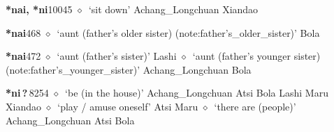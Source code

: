   \begin{list}{}{\leftmargin=1.5em \itemindent=-1.5em}
  \item {\footnotesize \textbf{*nai, *ni}}{\tiny 10045}
         $\diamond$~`sit down'
         Achang\_Longchuan 
\hspace{1ex}
         Xiandao 
  \item {\footnotesize \textbf{*nai}}{\tiny 468}
\hspace{1ex}
         $\diamond$~`aunt (father's older sister) (note:father's_older_sister)'
         Bola 
  \item {\footnotesize \textbf{*nai}}{\tiny 472}
\hspace{1ex}
         $\diamond$~`aunt (father's sister)'
         Lashi 
\hspace{1ex}
         $\diamond$~`aunt (father's younger sister) (note:father's_younger_sister)'
         Achang\_Longchuan 
\hspace{1ex}
         Bola 
  \item {\footnotesize \textbf{*ni\,?\,}}{\tiny 8254}
\hspace{1ex}
         $\diamond$~`be (in the house)'
         Achang\_Longchuan 
\hspace{1ex}
         Atsi 
\hspace{1ex}
         Bola 
\hspace{1ex}
         Lashi 
\hspace{1ex}
         Maru 
\hspace{1ex}
         Xiandao 
\hspace{1ex}
         $\diamond$~`play / amuse oneself'
         Atsi 
\hspace{1ex}
         Maru 
\hspace{1ex}
         $\diamond$~`there are (people)'
         Achang\_Longchuan 
\hspace{1ex}
         Atsi 
\hspace{1ex}
         Bola 

\end{list}
